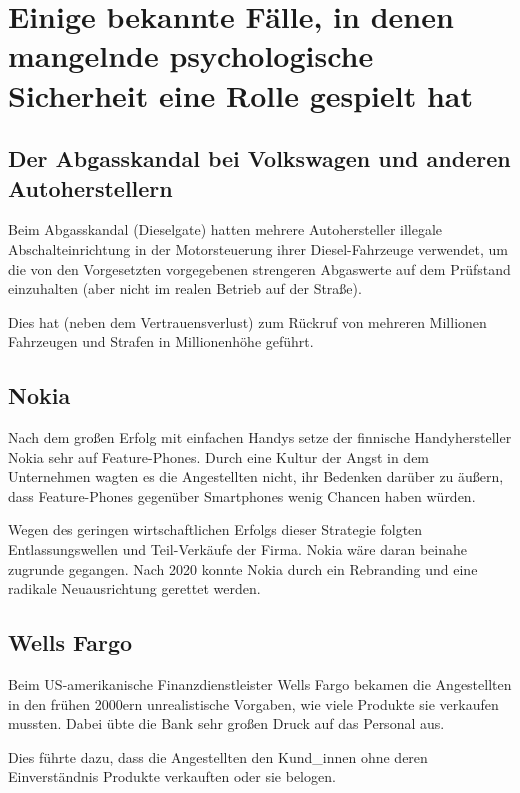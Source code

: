\section{Einige bekannte Fälle, in denen mangelnde psychologische Sicherheit eine Rolle gespielt hat}
\label{ps-faelle}


\subsection{Der Abgasskandal bei Volkswagen und anderen Autoherstellern}

Beim Abgasskandal (\glqq Dieselgate\grqq) hatten mehrere Autohersteller illegale Abschalteinrichtung in der Motorsteuerung ihrer Diesel-Fahrzeuge verwendet, um die von den Vorgesetzten vorgegebenen strengeren Abgaswerte auf dem Prüfstand einzuhalten (aber nicht im realen Betrieb auf der Straße).

Dies hat (neben dem Vertrauensverlust) zum Rückruf von mehreren Millionen Fahrzeugen und Strafen in Millionenhöhe geführt.


\subsection{Nokia}

Nach dem großen Erfolg mit einfachen Handys setze der finnische Handyhersteller Nokia sehr auf Feature-Phones. Durch eine Kultur der Angst in dem Unternehmen wagten es die Angestellten nicht, ihr Bedenken darüber zu äußern, dass Feature-Phones gegenüber Smartphones wenig Chancen haben würden.

Wegen des geringen wirtschaftlichen Erfolgs dieser Strategie folgten Entlassungswellen und Teil-Verkäufe der Firma. Nokia wäre daran beinahe zugrunde gegangen. Nach 2020 konnte Nokia durch ein Rebranding und eine radikale Neuausrichtung gerettet werden.


\subsection{Wells Fargo}

Beim US-amerikanische Finanzdienstleister Wells Fargo bekamen die Angestellten in den frühen 2000ern unrealistische Vorgaben, wie viele Produkte sie verkaufen mussten. Dabei übte die Bank sehr großen Druck auf das Personal aus.

Dies führte dazu, dass die Angestellten den Kund\_innen ohne deren Einverständnis Produkte verkauften oder sie belogen.

